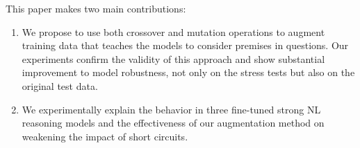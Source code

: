 

This paper makes two main contributions:
\begin{enumerate}
\item We propose to use both crossover and mutation operations
to augment training data that teaches the models to consider 
premises in questions. Our experiments confirm the validity 
of this approach and show substantial improvement to model robustness,
not only on the stress tests but also on the original test data.
\item We experimentally explain the behavior
in three fine-tuned strong NL reasoning models and the effectiveness of 
our augmentation method on weakening the impact of short circuits.
\end{enumerate}






